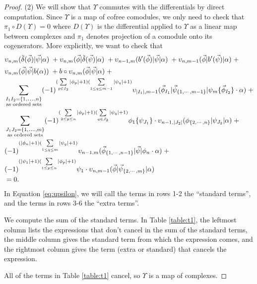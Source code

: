 \begin{proof}
(2) We will show that $\Upsilon$ commutes with 
the differentials by direct computation. Since 
$\Upsilon$ is a map of cofree comodules, we only 
need to check that $\pi_1 \circ D(\Upsilon) = 0$ 
where $D(\Upsilon)$ is the differential applied 
to $\Upsilon$ as a linear map between complexes 
and $\pi_1$ denotes projection of a comodule 
onto its cogenerators. More explicitly, we want 
to check that
\begin{equation} \label{eq:upsilon}
\begin{aligned}
&\upsilon_{n, m} ( \tilde{\delta}(\vec{\phi}) | \vec{\psi} | \alpha ) \; + 
\upsilon_{n, m} ( \vec{\phi} | \tilde{\delta}(\vec{\psi}) | \alpha ) \; + 
\upsilon_{n-1, m} ( b^\prime(\vec{\phi}) | \vec{\psi} | \alpha ) \; + 
\upsilon_{n, m-1} ( \vec{\phi} | b^\prime(\vec{\psi}) | \alpha ) \; + \\
&\upsilon_{n, m} ( \vec{\phi} | \vec{\psi} | b(\alpha) ) \; + 
b \circ \upsilon_{n, m} ( \vec{\phi} | \vec{\psi} | \alpha ) \; + \\
& \sum \limits_{\substack{
  I_1I_2 = \{1,\smdots,n\}\\ 
  \textrm{as ordered sets}}}
(-1)^{(\sum \limits_{p\in I_2}|\phi_p|+1)(\sum \limits_{1\leq q \leq m-1}|\psi_q|+1)}
  \upsilon_{|I_1|, m-1}(\vec{\phi}_{I_1} | \vec{\psi}_{\{1,\cdots, m-1\}} | \psi_{m} \{\vec{\phi}_{I_2}\} \cdot \alpha ) \; + \\
& \sum \limits_{\substack{
  J_1J_2 = \{1,\smdots,m\}\\ 
  \textrm{as ordered sets}}}
  (-1)^{(\sum \limits_{2 \leq p\leq n}|\phi_p|+1)(\sum \limits_{q\in J_2}|\psi_q|+1)}
\phi_1 \{ \psi_{J_1}\}\cdot \upsilon_{n-1, |J_2|}(\phi_{\{2,\cdots , n\}} | \psi_{J_2} | \alpha ) \; + \\  
& (-1)^{(|\phi_n|+1)(\sum \limits_{1\leq q \leq m}|\psi_q|+1)}
  \upsilon_{n-1, m}(\vec{\phi}_{\{1,\cdots, n-1\}} |\vec{\psi} | \phi_{n}\cdot \alpha) \; + \\
& (-1)^{(|\psi_1|+1)(\sum \limits_{1 \leq p \leq n}|\phi_p|+1)}
\psi_1\cdot \upsilon_{n,m-1} ( \vec{\phi} | \vec{\psi}_{\{2,\cdots, m\}} | \alpha) \\ 
&= 0.
\end{aligned}
\end{equation}
In Equation \ref{eq:upsilon}, we will call the 
terms in rows 1-2 the ``standard terms'', 
and the terms in rows 3-6 the 
``extra terms''.

We compute the sum of the standard terms. 
In Table \ref{table:t1}, the leftmost column 
lists the expressions that don't cancel in 
the sum of the standard terms, the middle 
column gives the standard term from which 
the expression comes, and the rightmost 
column gives the term (extra or standard) 
that cancels the expression. 

All of the terms in Table \ref{table:t1} 
cancel, so $\Upsilon$ is a map of complexes.
\end{proof}
